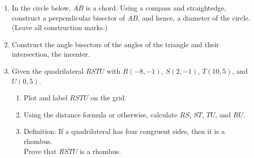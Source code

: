 \documentclass[12pt, oneside]{article}
\begin{document}
\begin{enumerate}
  \item In the circle below, $\overline{AB}$ is a chord. Using a compass and straightedge, construct a perpendicular bisector of $\overline{AB}$, and hence, a diameter of the circle. \\
  (Leave all construction marks.)
  \vspace{2cm}
    \begin{center}
    \end{center}

\newpage
  \item Construct the angle bisectors of the angles of the triangle and their intersection, the incenter.\\
    \vspace{3cm}
    \begin{center}
    \end{center}

\newpage
  \item Given the quadrilateral $RSTU$ with $R(-8,-1)$, $S(2,-1)$, $T(10,5)$, and $U(0,5)$.
  \begin{enumerate}
    \item Plot and label $RSTU$ on the grid.
    \item Using the distance formula or otherwise, calculate $RS$, $ST$, $TU$, and $RU$.
    \item Definition: If a quadrilateral has four congruent sides, then it is a rhombus.\\[0.5cm]
    Prove that $RSTU$ is a rhombus.
  \end{enumerate}

  \begin{center} %
  \end{center}


\end{enumerate}
\end{document}
